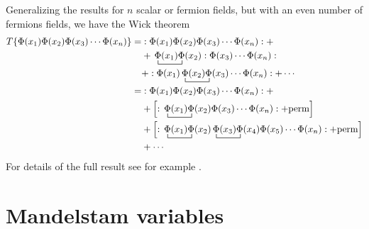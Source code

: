   


 Generalizing  the results for $n$ scalar or fermion fields, but with an even number of fermions fields, we have the Wick theorem
\begin{align}
  T\{\Phi(x_1)\Phi(x_2)\Phi(x_3)\cdots\Phi(x_n) \}
=&:\Phi(x_1)\Phi(x_2)\Phi(x_3)\cdots\Phi(x_n):+\nonumber\\
&+\bcontraction{\,}{\Phi}{(x_1)}{\Phi}\,\Phi(x_1)\Phi(x_2):\Phi(x_3)\cdots\Phi(x_n):\nonumber\\
&+:\Phi(x_1)\bcontraction{\,}{\Phi}{(x_2)}{\Phi}\,\Phi(x_2)\Phi(x_3)\cdots\Phi(x_n):+\cdots  \nonumber\\
=&:\Phi(x_1)\Phi(x_2)\Phi(x_3)\cdots\Phi(x_n):+\nonumber\\
&+\left[:\bcontraction{\,}{\Phi}{(x_1)}{\Phi}\,\Phi(x_1)\Phi(x_2)\Phi(x_3)\cdots\Phi(x_n): +\text{perm} \right]\nonumber\\
&+\left[  :\bcontraction{\,}{\Phi}{(x_1)}{\Phi}\,\Phi(x_1)\Phi(x_2) \bcontraction{\,}{\Phi}{(x_3)}{\Phi}\,\Phi(x_3)\Phi(x_4)\Phi(x_5)\cdots\Phi(x_n): +\text{perm}  \right] \nonumber\\
&+\cdots \nonumber\\
\end{align}
For details of the full result see for example \cite{Lahiri:2005sm}.


\section{Mandelstam variables}

